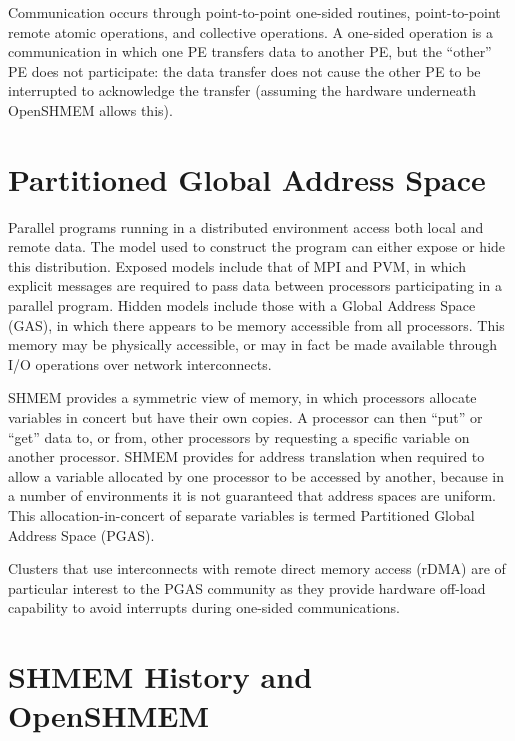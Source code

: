 \documentclass[english]{article}
\newcommand{\openshmem} {\mbox{OpenSHMEM}\xspace}
\begin{document}
Communication occurs through point-to-point one-sided routines,
point-to-point remote atomic operations, and collective operations. A
one-sided operation is a communication in which one PE transfers data
to another PE, but the ``other'' PE does not participate: the data
transfer does not cause the other PE to be interrupted to acknowledge
the transfer (assuming the hardware underneath \openshmem allows this).

\section{Partitioned Global Address Space}

Parallel programs running in a distributed environment access both
local and remote data. The model used to construct the program can
either expose or hide this distribution. Exposed models include that
of MPI and PVM, in which explicit messages are required to pass data
between processors participating in a parallel program. Hidden models
include those with a Global Address Space (GAS), in which there
appears to be memory accessible from all processors. This memory may
be physically accessible, or may in fact be made available through I/O
operations over network interconnects.

SHMEM provides a symmetric view of memory, in which processors
allocate variables in concert but have their own copies. A processor
can then ``put'' or ``get'' data to, or from, other processors by
requesting a specific variable on another processor. SHMEM provides
for address translation when required to allow a variable allocated by
one processor to be accessed by another, because in a number of
environments it is not guaranteed that address spaces are
uniform. This allocation-in-concert of separate variables is termed
Partitioned Global Address Space (PGAS).

Clusters that use interconnects with remote direct memory access
(rDMA) are of particular interest to the PGAS community as they
provide hardware off-load capability to avoid interrupts during
one-sided communications.

\section{SHMEM History and \openshmem}
\end{document}
